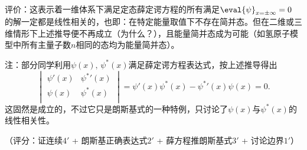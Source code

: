 \begin{enumerate}[label=1.\Alph*]
{\color{red} 评价：这表示着一维体系下满足定态薛定谔方程的所有满足$\eval{\psi}_{x=\pm \infty} = 0$
的解一定都是线性相关的，也即：在特定能量取值下不存在简并态。但在二维或三维情形下上述推导便不再成立（为什么？），且能量简并态成为可能（如氢原子模型中所有主量子数$n$相同的态均为能量简并态）。}

注：部分同学利用$\psi(x),\, \psi^*(x)$满足薛定谔方程表达式，按上述推导得出
\[\begin{vmatrix}
\psi'(x) & \psi^*'(x)\\
\psi(x) & \psi^*(x)\\
\end{vmatrix} = 
\psi'(x)\psi^*(x) - \psi^*'(x)\psi(x) = 0.\]
这固然是成立的，不过它只是朗斯基式的一种特例，只讨论了$\psi(x)$与$\psi^*(x)$的线性相关性。

（评分：证连续$4'$ + 朗斯基正确表达式$2'$ + 薛方程推朗斯基式$3'$ + 讨论边界$1'$）

\end{enumerate}